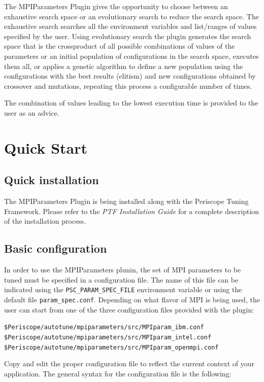 \documentclass[11pt,a4paper, oneside]{book} %
\begin{document}
The MPIParameters Plugin gives the opportunity to choose between an exhaustive search space or an evolutionary search to reduce the search space.
The exhaustive search searches all the environment variables and list/ranges of values specified by the user.
Using evolutionary search the plugin generates the search space that is the crossproduct of all possible combinations of values of the parameters or an initial population of configurations in the search space, executes them all, or applies a genetic algorithm to define a new population using the configurations with the best results (elitism) and new configurations obtained by crossover and mutations, repeating this process a configurable number of times.

The combination of values leading to the lowest execution time is provided to the user as an advice.

\chapter{Quick Start}
\section{Quick installation}
The MPIParameters Plugin is being installed along with the Periscope Tuning Framework. Please refer to the \textit{PTF Installation Guide} for a complete description of the installation process.


\section{Basic configuration}
In order to use the MPIParameters plunin, the set of MPI parameters to be tuned must be specified in a configuration file. The name of this file can be indicated using the {\tt PSC\_PARAM\_SPEC\_FILE} environment variable or using the default file \texttt{param\_spec.conf}. Depending on what flavor of MPI is being used, the user can start from one of the three configuration files provided with the plugin: 


\begin{center}
\texttt{\$Periscope/autotune/mpiparameters/src/MPIparam\_ibm.conf}
\texttt{\$Periscope/autotune/mpiparameters/src/MPIparam\_intel.conf}
\texttt{\$Periscope/autotune/mpiparameters/src/MPIparam\_openmpi.conf}
\end{center}

Copy and edit the proper configuration file to reflect the current context of your application. The general syntax for the configuration file is the following:
\end{document}
